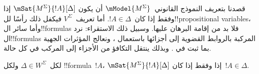 \documentclass[../../../include/open-logic-section]{subfiles}
\begin{document}


قصدنا بتعريف النموذج القانوني~$\mModel{M^\Sigma}$ أن يكون
$\mSat{M^\Sigma}{!A}[\Delta]$ إذا وفقط إذا كان~$!A \in \Delta$.
أما تعريف~$V^\Sigma$ فيكفل ذلك رأسًا لل!!{propositional
variable}s، وأما سائر ال!!{formula}s فلا بد من إقامة البرهان عليها.
وسبيل ذلك الاستقراء: نرد ال!!{formula}s المركبة بالروابط القضوية
إلى أجزائها باستعمال ،
ونعالج المؤثرات الجهية بما ثبت في .
وبذلك ينتقل التكافؤ من الأجزاء إلى المركب في كل حالة.

\begin{prop}[لمّة الصدق]
  لكل~$\Delta \in W^\Sigma$ ولكل !!{formula}~$!A$،
  $\mSat{M^\Sigma}{!A}[\Delta]$ إذا وفقط إذا كان~$!A \in \Delta$.
\end{prop}
\end{document}
